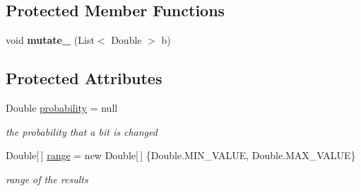 \subsection*{Protected Member Functions}
\begin{DoxyCompactItemize}
\item 
\hypertarget{classcom_1_1msu_1_1moo_1_1operators_1_1mutation_1_1PolynomialMutation_acd61972e04896b67faa1feba0f1454c5}{void {\bfseries mutate\-\_\-} (List$<$ Double $>$ b)}\label{classcom_1_1msu_1_1moo_1_1operators_1_1mutation_1_1PolynomialMutation_acd61972e04896b67faa1feba0f1454c5}

\end{DoxyCompactItemize}
\subsection*{Protected Attributes}
\begin{DoxyCompactItemize}
\item 
\hypertarget{classcom_1_1msu_1_1moo_1_1operators_1_1mutation_1_1PolynomialMutation_ac70d8ffc1d71d3d3c28554eecebf69db}{Double \hyperlink{classcom_1_1msu_1_1moo_1_1operators_1_1mutation_1_1PolynomialMutation_ac70d8ffc1d71d3d3c28554eecebf69db}{probability} = null}\label{classcom_1_1msu_1_1moo_1_1operators_1_1mutation_1_1PolynomialMutation_ac70d8ffc1d71d3d3c28554eecebf69db}

\begin{DoxyCompactList}\small\item\em the probability that a bit is changed \end{DoxyCompactList}\item 
\hypertarget{classcom_1_1msu_1_1moo_1_1operators_1_1mutation_1_1PolynomialMutation_ab96c1108fc7a705fa962bdc611fcf152}{Double\mbox{[}$\,$\mbox{]} \hyperlink{classcom_1_1msu_1_1moo_1_1operators_1_1mutation_1_1PolynomialMutation_ab96c1108fc7a705fa962bdc611fcf152}{range} = new Double\mbox{[}$\,$\mbox{]} \{Double.\-M\-I\-N\-\_\-\-V\-A\-L\-U\-E, Double.\-M\-A\-X\-\_\-\-V\-A\-L\-U\-E\}}\label{classcom_1_1msu_1_1moo_1_1operators_1_1mutation_1_1PolynomialMutation_ab96c1108fc7a705fa962bdc611fcf152}

\begin{DoxyCompactList}\small\item\em range of the results \end{DoxyCompactList}\end{DoxyCompactItemize}


